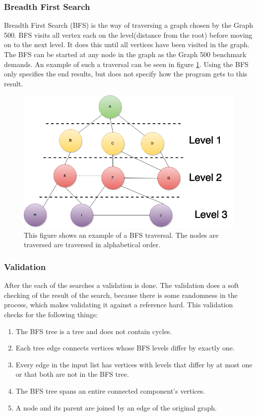 \subsubsection{Breadth First Search}
Breadth First Search\cite{bfs} (BFS) is the way of traversing a graph chosen by the Graph 500. BFS visits all vertex each on the level(distance from the root) before moving on to the next level. It does this until all vertices have been visited in the graph. The BFS can be started at any node in the graph as the Graph 500 benchmark demands. An example of such a traversal can be seen in figure \ref{fig:bfs}. Using the BFS only specifies the end results, but does not specify how the program gets to this result.
\begin{figure}[!h]
	\includegraphics[width=\textwidth]{images/BFS-example1-with-levels}
	\caption{This figure shows an example of a BFS traversal. The nodes are traversed are traversed in alphabetical order.}
	\label{fig:bfs}
\end{figure}

\subsubsection{Validation}
After the each of the searches a validation is done. The validation does a soft checking of the result of the search, because there is some randomness in the process, which makes validating it against a reference hard. This validation checks for the following things:
\begin{enumerate}
\item The BFS tree is a tree and does not contain cycles.
\item Each tree edge connects vertices whose BFS levels differ by exactly one.
\item Every edge in the input list has vertices with levels that differ by at most one or that both are not in the BFS tree.
\item The BFS tree spans an entire connected component's vertices.
\item A node and its parent are joined by an edge of the original graph.
\end{enumerate}


